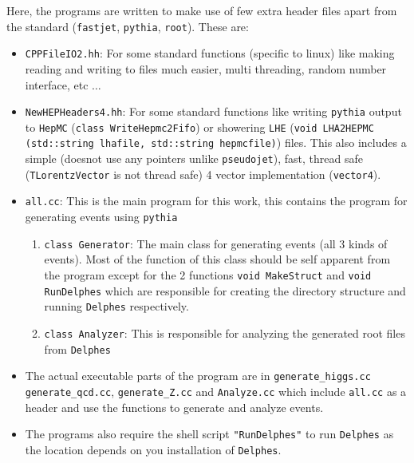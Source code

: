 Here, the programs are written to make use of few extra header files apart from the standard ({\tt fastjet}, {\tt pythia}, {\tt root}). These are:
\begin{itemize}
	\item {\tt CPPFileIO2.hh}: For some standard functions (specific to linux) like making reading and writing to files much easier, multi threading, random number interface, etc $\dots$
	
	\item {\tt NewHEPHeaders4.hh}: For some standard functions like writing {\tt pythia} output to {\tt HepMC} ({\tt class WriteHepmc2Fifo}) or showering {\tt LHE} ({\tt void LHA2HEPMC (std::string lhafile, std::string hepmcfile)}) files. This also includes a simple (doesnot use any pointers unlike {\tt pseudojet}), fast, thread safe ({\tt TLorentzVector} is not thread safe) 4 vector implementation ({\tt vector4}).
	
	\item {\tt all.cc}: This is the main program for this work, this contains the program for generating events using {\tt pythia}
	\begin{enumerate}
		\item {\tt class Generator}: The main class for generating events (all 3 kinds of events). Most of the function of this class should be self apparent from the program except for the 2 functions {\tt void MakeStruct} and {\tt void RunDelphes} which are responsible for creating the directory structure and running {\tt Delphes} respectively.
		
		\item {\tt class Analyzer}: This is responsible for analyzing the generated root files from {\tt Delphes}
	\end{enumerate}

	\item The actual executable parts of the program are in
	{\tt generate\_higgs.cc} {\tt generate\_qcd.cc}, {\tt generate\_Z.cc} and {\tt Analyze.cc} which include {\tt all.cc} as a header and use the functions to generate and analyze events.
	
	\item The programs also require the shell script {\tt "RunDelphes"} to run {\tt Delphes} as the location depends on you installation of {\tt Delphes}.
	
\end{itemize}

